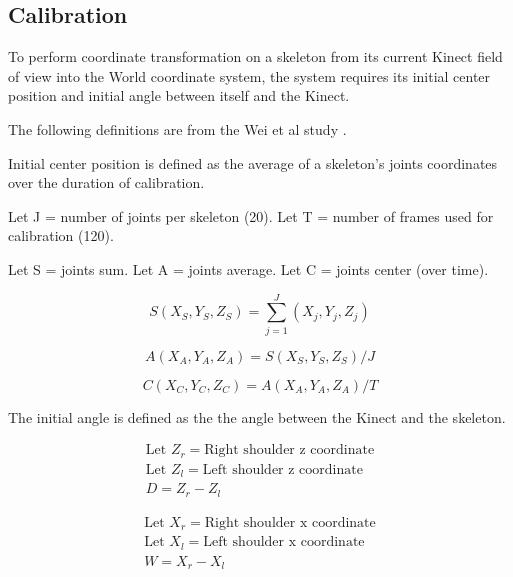 \documentclass{sigchi}
\begin{document}
\subsection{Calibration}

To perform coordinate transformation on a skeleton from its current Kinect field of view into the World coordinate system, the system requires its initial center position and initial angle between itself and the Kinect.  

The following definitions are from the Wei et al study \cite{wei_kinect_calibration}.

Initial center position is defined as the average of a skeleton's joints coordinates over the duration of calibration.

Let J = number of joints per skeleton (20). Let T = number of frames used for calibration (120).

Let S = joints sum. Let A = joints average. Let C = joints center (over time). 

\begin{equation}
\label{eq:joints_sum}
S(X_S, Y_S, Z_S) = \sum_{j=1}^J (X_j, Y_j, Z_j)
\end{equation}

\begin{equation}
\label{eq:joints_average}
A(X_A, Y_A, Z_A) = S(X_S, Y_S, Z_S) / J
\end{equation}

\begin{equation}
\label{eq:joints_center}
C(X_C, Y_C, Z_C) = A(X_A, Y_A, Z_A) / T
\end{equation}

The initial angle is defined as the the angle between the Kinect and the skeleton.

\begin{equation}
\label{eq:theta_d}
\begin{gathered}
\text{Let } Z_r = \text{Right shoulder z coordinate} \\
\text{Let } Z_l = \text{Left shoulder z coordinate} \\
D = Z_r - Z_l
\end{gathered}
\end{equation}

\begin{equation}
\label{eq:theta_w}
\begin{gathered}
\text{Let } X_r = \text{Right shoulder x coordinate} \\
\text{Let } X_l = \text{Left shoulder x coordinate} \\
W = X_r - X_l
\end{gathered}
\end{equation}
\end{document}
